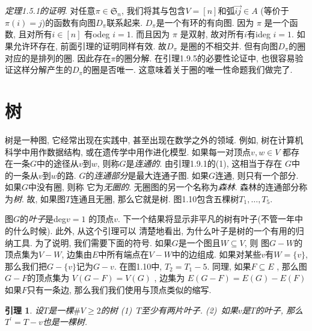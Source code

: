 \documentclass{ctexbook}
\newtheorem{lem}[thm]{引理}
\begin{document}
\textsl{定理1.5.1的证明}. 对任意$\pi \in \mathfrak{S}_{n}$, 我们将其与包含$V=[n]$和弧$\overrightarrow{ij} \in A$
(等价于$\pi(i)=j$)的函数有向图$D_{\pi}$联系起来. $D_{\pi}$是一个有环的有向图. 因为 $\pi$ 是一个函数, 且对所有$i \in[n]$
有odeg $i=1$. 而且因为 $\pi$ 是双射, 故对所有$i$有ideg $i=1$. 如果允许环存在, 前面引理的证明同样有效. 故$D_{\pi}$
是圈的不相交并. 但有向图$D_{\pi}$的圈对应的是排列的圈. 因此存在$\pi$的圈分解. 在引理1.9.5的必要性论证中,
也很容易验证这样分解产生的$D_{\pi}$的圈是否唯一. 这意味着关于圈的唯一性命题我们做完了. \hfill\qedsymbol

\section{树}
树是一种图, 它经常出现在实践中, 甚至出现在数学之外的领域. 例如, 树在计算机科学中用作数据结构, 或在遗传学中用作进化模型.
如果每一对顶点$v, w \in V$ 都存在一条$G$中的途径从$v$到$w$, 则称$G$是\textsl{连通的}. 由引理1.9.1的(1), 这相当于存在
$G$中的一条从$v$到$w$的路. $G$的\textsl{连通部分}是最大连通子图. 如果$G$连通, 则只有一个部分. 如果$G$中没有圈, 则称
它为\textsl{无圈的}. 无圈图的另一个名称为\textsl{森林}. 森林的连通部分称为\textsl{树}. 故, 如果图$T$连通且无圈,
那么它就是树. 图1.10包含五棵树$T_{1}, \ldots, T_{5}$.

图$G$的\textsl{叶子}是deg$ v=1$ 的顶点$v$. 下一个结果将显示非平凡的树有叶子(不管一年中的什么时候). 此外, 从这个引理可以
清楚地看出, 为什么叶子是树的一个有用的归纳工具. 为了说明, 我们需要下面的符号. 如果$G$是一个图且$W \subseteq V$, 则
图$G-W$的顶点集为$V-W$, 边集由$E$中所有端点在$V-W$中的边组成. 如果对某些$v$有$W=\{v\}$, 那么我们把$G-\{v\}$记为$G-v$.
在图1.10中, $T_{2}=T_{1}-5$. 同理, 如果$F \subseteq E$ , 那么图$G-F$的顶点集为 $V(G-F)=V(G)$ , 边集为 $E(G-F)=E(G)-E(F)$
如果$F$只有一条边, 那么我们我们使用与顶点类似的缩写.
          \begin{lem}
         	设$T$是一棵$\# V \geqslant 2$的树
            (1)\ $T$至少有两片叶子.
            (2)\ 如果$v$是$T$的叶子, 那么$T^{\prime}=T-v$也是一棵树.
         \end{lem}
\end{document}
